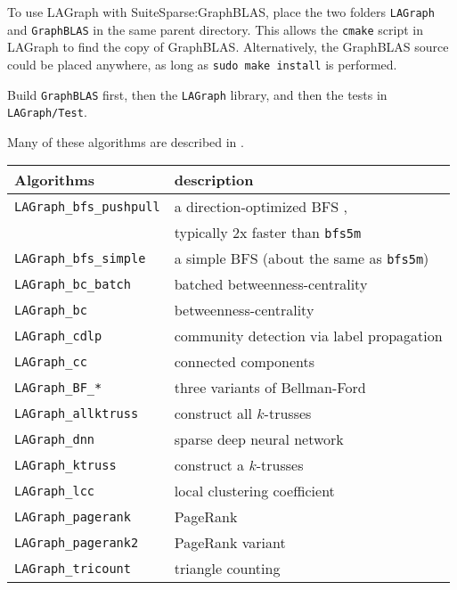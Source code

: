 \documentclass[12pt]{article}
\begin{document}
To use LAGraph with SuiteSparse:GraphBLAS, place the two folders \verb'LAGraph'
and \verb'GraphBLAS' in the same parent directory.  This allows the
\verb'cmake' script in LAGraph to find the copy of GraphBLAS.  Alternatively,
the GraphBLAS source could be placed anywhere, as long as
\verb'sudo make install' is performed.

Build \verb'GraphBLAS' first, then the \verb'LAGraph' library, and then the
tests in \verb'LAGraph/Test'.

Many of these algorithms are described in \cite{Davis20}.

\vspace{0.1in}
{\small
\begin{tabular}{ll}
\hline
\hline
Algorithms & description \\
\hline
\hline
\verb'LAGraph_bfs_pushpull' & a direction-optimized BFS
                                \cite{Beamer:2012:DOB,Yang:2018:IPE}, \\
                            & typically 2x faster than \verb'bfs5m' \\
\verb'LAGraph_bfs_simple'   & a simple BFS (about the same as \verb'bfs5m') \\
\verb'LAGraph_bc_batch'     & batched betweenness-centrality \\
\verb'LAGraph_bc'           & betweenness-centrality \\
\verb'LAGraph_cdlp'         & community detection via label propagation \\
\verb'LAGraph_cc'           & connected components \\
\verb'LAGraph_BF_*'         & three variants of Bellman-Ford \\
\verb'LAGraph_allktruss'    & construct all $k$-trusses \\
\verb'LAGraph_dnn'          & sparse deep neural network \cite{DavisAznavehKolodziej19} \\
\verb'LAGraph_ktruss'       & construct a $k$-trusses \\
\verb'LAGraph_lcc'          & local clustering coefficient \\
\verb'LAGraph_pagerank'     & PageRank \\
\verb'LAGraph_pagerank2'    & PageRank variant \\
\verb'LAGraph_tricount'     & triangle counting \\
\end{tabular}}
\end{document}
